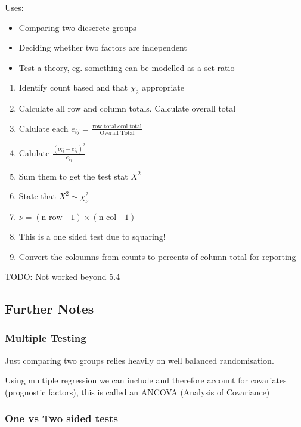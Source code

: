 \documentclass[
  letterpaper,
  DIV=11,
  numbers=noendperiod]{scrreprt}
\providecommand{\tightlist}{%
  \setlength{\itemsep}{0pt}\setlength{\parskip}{0pt}}\usepackage{longtable,booktabs,array}
\begin{document}
Uses:

\begin{itemize}
\tightlist
\item
  Comparing two dicscrete groups
\item
  Deciding whether two factors are independent
\item
  Test a theory, eg. something can be modelled as a set ratio
\end{itemize}

\begin{enumerate}
\def\labelenumi{\arabic{enumi})}
\tightlist
\item
  Identify count based and that \(\chi_2\) appropriate
\item
  Calculate all row and column totals. Calculate overall total
\item
  Calulate each
  \(e_{ij} = \frac{\text{row total}\times \text{col total}}{\text{Overall Total}}\)
\item
  Calulate \(\frac{(o_{ij}-e_{ij})^2}{e_{ij}}\)
\item
  Sum them to get the test stat \(X^2\)
\item
  State that \(X^2 \sim \chi^2_{\nu}\)
\item
  \(\nu = (\text{n row - 1})\times (\text{n col - 1})\)
\item
  This is a one sided test due to squaring!
\item
  Convert the coloumns from counts to percents of column total for
  reporting
\end{enumerate}

TODO: Not worked beyond 5.4

\hypertarget{further-notes}{%
\subsection{Further Notes}\label{further-notes}}

\hypertarget{multiple-testing}{%
\subsubsection{Multiple Testing}\label{multiple-testing}}

Just comparing two groups relies heavily on well balanced randomisation.

Using multiple regression we can include and therefore account for
covariates (prognostic factors), this is called an ANCOVA (Analysis of
Covariance)

\hypertarget{one-vs-two-sided-tests}{%
\subsubsection{One vs Two sided tests}\label{one-vs-two-sided-tests}}
\end{document}

